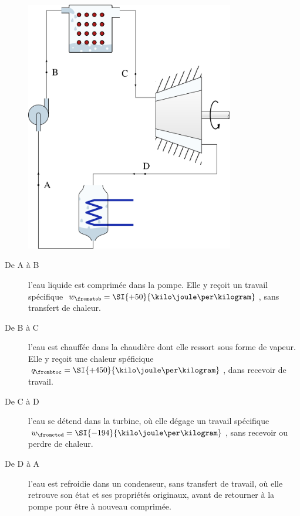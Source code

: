 			\begin{figure}
			\begin{center}
				\includegraphics[height=11cm]{images/circuit_rankine.png}
			\end{center}
			\label{fig_cycle_rankine_chap_un}
		\end{figure}

		\begin{description}
			\item[De A à B] l’eau liquide est comprimée dans la pompe. Elle y reçoit un travail spécifique $w_\fromatob = \SI{+50}{\kilo\joule\per\kilogram}$, sans transfert de chaleur.
			\item[De B à C] l’eau est chauffée dans la chaudière dont elle ressort sous forme de vapeur. Elle y reçoit une chaleur spéficique $q_\frombtoc = \SI{+450}{\kilo\joule\per\kilogram}$, dans recevoir de travail.
			\item[De C à D] l’eau se détend dans la turbine, où elle dégage un travail spécifique $w_\fromctod = \SI{-194}{\kilo\joule\per\kilogram}$, sans recevoir ou perdre de chaleur.
			\item[De D à A] l’eau est refroidie dans un condenseur, sans transfert de travail, où elle retrouve son état et ses propriétés originaux, avant de retourner à la pompe pour être à nouveau comprimée.
		\end{description}

